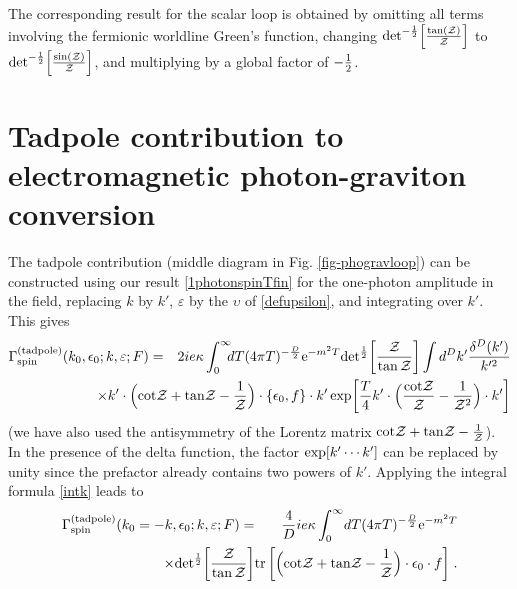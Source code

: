 \documentclass[a4paper,11pt]{article}
\begin{document}
The corresponding result for the scalar loop is obtained by omitting all terms involving the fermionic
worldline Green's function, changing ${\rm det}^{-{1\over 2}}\Bigl[{{\rm tan}({\cal Z})\over {\cal Z}}\Bigr]$
to
${\rm det}^{-{1\over 2}}\Bigl[{{\rm sin}({\cal Z})\over {\cal Z}}\Bigr]$,
and multiplying by a global factor of $-{1\over 2}$. 

\section{Tadpole contribution to electromagnetic photon-graviton conversion}
\label{tadpole}
\renewcommand{\theequation}{5.\arabic{equation}}
\setcounter{equation}{0}

The tadpole contribution (middle diagram in Fig. \ref{fig-phogravloop}) can be constructed using our result
\eqref{1photonspinTfin} for the one-photon amplitude in the field, replacing $k$ by $k'$, $\varepsilon$
by the $\upsilon$ of \eqref{defupsilon}, and integrating over $k'$. This gives
%
\begin{eqnarray}
\Gamma_{\rm spin}^{\rm (tadpole)}(k_0,\epsilon_0;k,\varepsilon;F) &=& 
2ie\kappa
\int_{0}^{\infty}} \! \! dT
{(4\pi T)^{-{D\over 2}}
{\rm e}^{-m^2T}
{\rm det}^{{1\over 2}} \biggl[\frac{\cZ}{\tan\cZ}\biggr]
\int d^D k' \frac{\delta^D (k')}{k'^2}
\nonumber\\ 
&&\hspace{-100pt} \times
k'\cdot
\Bigl({\cot}{\cZ} + {\tan}{\cZ}  - \frac{1}{\cZ}\Bigr)
\cdot \lbrace \epsilon_0,f\rbrace \cdot  k' 
\,{\rm exp}\biggl[\frac{T}{4} 
k'\cdot 
\Bigl(\frac{{\cot}\cZ}{\cZ}- \frac{1}{{\cZ}^2}\Bigr)
\cdot  k'\biggr]
\label{17-tadpole}
\end{eqnarray}
(we have also used the antisymmetry of the Lorentz matrix ${\cot}{{\cal Z}} + {\tan}{{\cal Z}}  - \frac{1}{{\cal Z}}$). 
In the presence of the delta function, the factor ${\rm exp}[k'\cdots k']$ can be replaced by unity since the prefactor
already contains two powers of $k'$. Applying the integral formula \eqref{intk}
leads to
%
\begin{eqnarray}
\Gamma_{\rm spin}^{\rm (tadpole)}(k_0=-k,\epsilon_0;k,\varepsilon;F) &=& 
\frac{4}{D}ie\kappa
\int_{0}^{\infty}}dT
{(4\pi T)^{-{D\over 2}}
{\rm e}^{-m^2T}
\nonumber\\ 
&&\hspace{-75pt} \times
{\rm det}^{{1\over 2}} \biggl[\frac{\cZ}{\tan\cZ}\biggr]
\tr\biggl\lbrack
\Bigl({\cot}{\cZ} + {\tan}{\cZ}  - \frac{1}{\cZ}\Bigr)
\cdot \epsilon_0 \cdot f \biggr\rbrack \;. 
\label{17-tadpole2}
\end{eqnarray}
\end{document}
